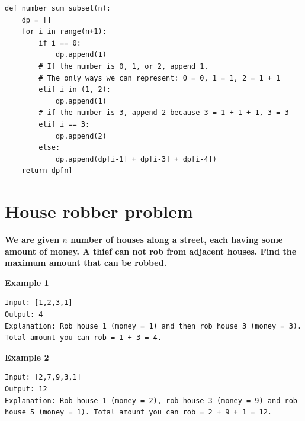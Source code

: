 \documentclass[a4paper,11pt]{book}
\begin{document}
\begin{lstlisting}
def number_sum_subset(n):
    dp = []
    for i in range(n+1):
        if i == 0:
            dp.append(1)
        # If the number is 0, 1, or 2, append 1.
        # The only ways we can represent: 0 = 0, 1 = 1, 2 = 1 + 1
        elif i in (1, 2):
            dp.append(1)
        # if the number is 3, append 2 because 3 = 1 + 1 + 1, 3 = 3
        elif i == 3:
            dp.append(2)
        else:
            dp.append(dp[i-1] + dp[i-3] + dp[i-4])
    return dp[n]
\end{lstlisting}

\section{House robber problem}

\noindent \textbf{We are given $n$ number of houses along a street, each having some amount of money. A thief can not rob from adjacent houses. Find the maximum amount that can be robbed.}

\vspace{5mm}

\noindent \textbf{Example 1}
\begin{lstlisting}
Input: [1,2,3,1]
Output: 4
Explanation: Rob house 1 (money = 1) and then rob house 3 (money = 3). Total amount you can rob = 1 + 3 = 4.
\end{lstlisting}

\noindent \textbf{Example 2}
\begin{lstlisting}
Input: [2,7,9,3,1]
Output: 12
Explanation: Rob house 1 (money = 2), rob house 3 (money = 9) and rob house 5 (money = 1). Total amount you can rob = 2 + 9 + 1 = 12.
\end{lstlisting}

\end{document}
